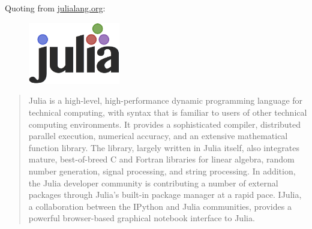 Quoting from \url{julialang.org}:\\
\begin{figure}
  \centering
  \includegraphics[width=4cm]{figures/julia.png}
\end{figure}
\begin{quote}
Julia is a high-level, high-performance dynamic programming language for
technical computing, with syntax that is familiar to users of other technical
computing environments. It provides a sophisticated compiler, distributed
parallel execution, numerical accuracy, and an extensive mathematical function
library. The library, largely written in Julia itself, also integrates mature,
best-of-breed C and Fortran libraries for linear algebra, random number
generation, signal processing, and string processing. In addition, the Julia
developer community is contributing a number of external packages through
Julia’s built-in package manager at a rapid pace. IJulia, a collaboration
between the IPython and Julia communities, provides a powerful browser-based
graphical notebook interface to Julia.
\end{quote}
